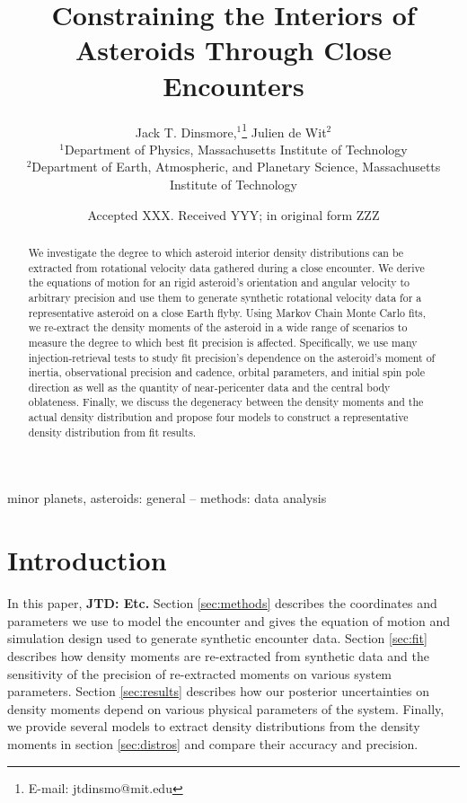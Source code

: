 \documentclass[fleqn,usenatbib]{mnras}
\title[Flyby Constraints on Asteroids Interiors]{Constraining the Interiors of Asteroids Through Close Encounters}
\author[Jack T. Dinsmore]{
Jack T. Dinsmore,$^{1}$\thanks{E-mail: jtdinsmo@mit.edu}
Julien de Wit$^{2}$
\\
$^{1}$Department of Physics, Massachusetts Institute of Technology\\
$^{2}$Department of Earth, Atmospheric, and Planetary Science, Massachusetts Institute of Technology
}
\date{Accepted XXX. Received YYY; in original form ZZZ}
\newcommand{\jtd}[1]{ {\bf{\color{red} JTD: #1}} }
\begin{document}
\label{firstpage}
\pagerange{\pageref{firstpage}--\pageref{lastpage}}
\maketitle

\begin{abstract}
  We investigate the degree to which asteroid interior density distributions can be extracted from rotational velocity data gathered during a close encounter. We derive the equations of motion for an rigid asteroid's orientation and angular velocity to arbitrary precision and use them to generate synthetic rotational velocity data for a representative asteroid on a close Earth flyby. Using Markov Chain Monte Carlo fits, we re-extract the density moments of the asteroid in a wide range of scenarios to measure the degree to which best fit precision is affected. Specifically, we use many injection-retrieval tests to study fit precision's dependence on the asteroid's moment of inertia, observational precision and cadence, orbital parameters, and initial spin pole direction as well as the quantity of near-pericenter data and the central body oblateness. Finally, we discuss the degeneracy between the density moments and the actual density distribution and propose four models to construct a representative density distribution from fit results.
\end{abstract}

\begin{keywords}
  minor planets, asteroids: general -- methods: data analysis
\end{keywords}



\section{Introduction}

\cite{MOSKOVITZ2020113519}

In this paper, \jtd{Etc.} Section \ref{sec:methods} describes the coordinates and parameters we use to model the encounter and gives the equation of motion and simulation design used to generate synthetic encounter data. Section \ref{sec:fit} describes how density moments are re-extracted from synthetic data and the sensitivity of the precision of re-extracted moments on various system parameters. Section \ref{sec:results} describes how our posterior uncertainties on density moments depend on various physical parameters of the system. Finally, we provide several models to extract density distributions from the density moments in section \ref{sec:distros} and compare their accuracy and precision.
\end{document}
